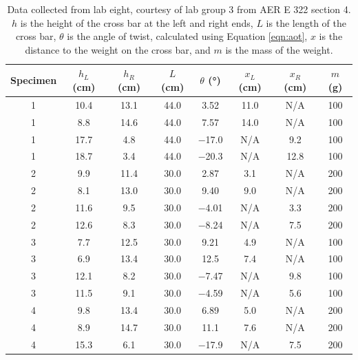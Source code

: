 \documentclass[12 pt]{report}
\begin{document}
\begin{table}[!htbp]
\caption{Data collected from lab eight, courtesy of lab group \num{3} from AER E 322 section \num{4}. $h$ is the height of the cross bar at the left and right ends, $L$ is the length of the cross bar, $\theta$ is the angle of twist, calculated using Equation \ref{eqn:aot}, $x$ is the distance to the weight on the cross bar, and $m$ is the mass of the weight.}
\begin{center}
	\begin{tabular}{|c|c|c|c|c|c|c|c|}
		\hline
		Specimen&$h_L$ (\unit{\cm})&$h_R$ (\unit{\cm})&$L$ (\unit{\cm})&$\theta$ (\unit{\degree})&$x_L$ (\unit{cm})&$x_R$ (\unit{cm})&$m$ (\unit{\g})\\
		\hline
		\num{1}&\num{10.4}&\num{13.1}&\num{44.0}&\num{3.52}&\num{11.0}&N/A&\num{100}\\
		\hline
		\num{1}&\num{8.8}&\num{14.6}&\num{44.0}&\num{7.57}&\num{14.0}&N/A&\num{100}\\
		\hline
		\num{1}&\num{17.7}&\num{4.8}&\num{44.0}&\num{-17.0}&N/A&\num{9.2}&\num{100}\\
		\hline
		\num{1}&\num{18.7}&\num{3.4}&\num{44.0}&\num{-20.3}&N/A&\num{12.8}&\num{100}\\
		\hline
		\num{2}&\num{9.9}&\num{11.4}&\num{30.0}&\num{2.87}&\num{3.1}&N/A&\num{200}\\
		\hline
		\num{2}&\num{8.1}&\num{13.0}&\num{30.0}&\num{9.40}&\num{9.0}&N/A&\num{200}\\
		\hline
		\num{2}&\num{11.6}&\num{9.5}&\num{30.0}&\num{-4.01}&N/A&\num{3.3}&\num{200}\\
		\hline
		\num{2}&\num{12.6}&\num{8.3}&\num{30.0}&\num{-8.24}&N/A&\num{7.5}&\num{200}\\
		\hline
		\num{3}&\num{7.7}&\num{12.5}&\num{30.0}&\num{9.21}&\num{4.9}&N/A&\num{100}\\
		\hline
		\num{3}&\num{6.9}&\num{13.4}&\num{30.0}&\num{12.5}&\num{7.4}&N/A&\num{100}\\
		\hline
		\num{3}&\num{12.1}&\num{8.2}&\num{30.0}&\num{-7.47}&N/A&\num{9.8}&\num{100}\\
		\hline
		\num{3}&\num{11.5}&\num{9.1}&\num{30.0}&\num{-4.59}&N/A&\num{5.6}&\num{100}\\
		\hline
		\num{4}&\num{9.8}&\num{13.4}&\num{30.0}&\num{6.89}&\num{5.0}&N/A&\num{200}\\
		\hline
		\num{4}&\num{8.9}&\num{14.7}&\num{30.0}&\num{11.1}&\num{7.6}&N/A&\num{200}\\
		\hline
		\num{4}&\num{15.3}&\num{6.1}&\num{30.0}&\num{-17.9}&N/A&\num{7.5}&\num{200}\\

\end{tabular}
\end{center}
\end{table}
\end{document}
